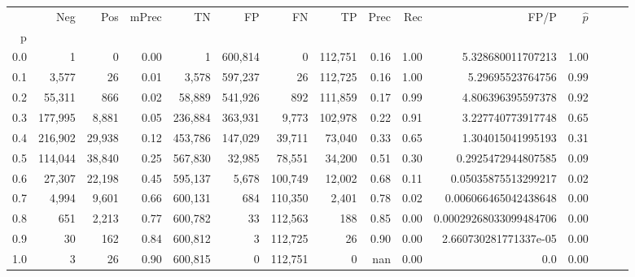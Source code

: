 \begin{tabular}{rrrrrrrrrrrrrrr}
\toprule
{} &      Neg &     Pos & mPrec &       TN &       FP &       FN &       TP &  Prec &   Rec &                    FP/P & $\hat{p}$ \\
p   &          &         &       &          &          &          &          &       &       &                         &           \\
\midrule
0.0 &        1 &       0 &  0.00 &        1 &  600,814 &        0 &  112,751 &  0.16 &  1.00 &       5.328680011707213 &      1.00 \\
0.1 &    3,577 &      26 &  0.01 &    3,578 &  597,237 &       26 &  112,725 &  0.16 &  1.00 &        5.29695523764756 &      0.99 \\
0.2 &   55,311 &     866 &  0.02 &   58,889 &  541,926 &      892 &  111,859 &  0.17 &  0.99 &       4.806396395597378 &      0.92 \\
0.3 &  177,995 &   8,881 &  0.05 &  236,884 &  363,931 &    9,773 &  102,978 &  0.22 &  0.91 &       3.227740773917748 &      0.65 \\
0.4 &  216,902 &  29,938 &  0.12 &  453,786 &  147,029 &   39,711 &   73,040 &  0.33 &  0.65 &       1.304015041995193 &      0.31 \\
0.5 &  114,044 &  38,840 &  0.25 &  567,830 &   32,985 &   78,551 &   34,200 &  0.51 &  0.30 &      0.2925472944807585 &      0.09 \\
0.6 &   27,307 &  22,198 &  0.45 &  595,137 &    5,678 &  100,749 &   12,002 &  0.68 &  0.11 &     0.05035875513299217 &      0.02 \\
0.7 &    4,994 &   9,601 &  0.66 &  600,131 &      684 &  110,350 &    2,401 &  0.78 &  0.02 &    0.006066465042438648 &      0.00 \\
0.8 &      651 &   2,213 &  0.77 &  600,782 &       33 &  112,563 &      188 &  0.85 &  0.00 &  0.00029268033099484706 &      0.00 \\
0.9 &       30 &     162 &  0.84 &  600,812 &        3 &  112,725 &       26 &  0.90 &  0.00 &   2.660730281771337e-05 &      0.00 \\
1.0 &        3 &      26 &  0.90 &  600,815 &        0 &  112,751 &        0 &   nan &  0.00 &                     0.0 &      0.00 \\
\bottomrule
\end{tabular}
